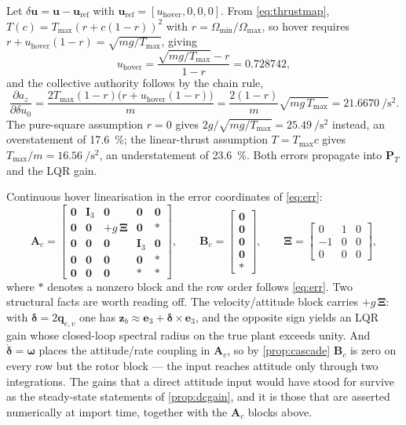 \documentclass[11pt,a4paper,twoside,openright]{report}
\newcommand{\vUhover}{0.728742}          %
\newcommand{\vDadc}{21.6670}             %
\renewcommand{\vec}[1]{\bm{#1}}
\newcommand{\mat}[1]{\bm{#1}}
\newcommand{\inp}{\vec{u}}
\newcommand{\bodyrate}{\vec{\omega}}
\newcommand{\refsym}{\mathrm{ref}}
\theoremstyle{plain}
\theoremstyle{definition}
\theoremstyle{remark}
\begin{document}
	Let $\delta\inp=\inp-\inp_\refsym$ with
	$\inp_\refsym=[u_\mathrm{hover},0,0,0]$. From \cref{eq:thrustmap},
	$T(c)=T_{\max}(r+c(1-r))^2$ with $r=\Omega_{\min}/\Omega_{\max}$, so hover
	requires $r+u_\mathrm{hover}(1-r)=\sqrt{mg/T_{\max}}$, giving
	\begin{equation}
		u_\mathrm{hover}=\frac{\sqrt{mg/T_{\max}}-r}{1-r}=\vUhover,
	\end{equation}
	and the collective authority follows by the chain rule,
	\begin{equation}
		\frac{\partial a_z}{\partial\delta u_0}
		=\frac{2T_{\max}(1-r)\big(r+u_\mathrm{hover}(1-r)\big)}{m}
		=\frac{2(1-r)}{m}\sqrt{mg\,T_{\max}}
		=\vDadc\ \si{\per\square\second}.
	\end{equation}
	The pure-square assumption $r=0$ gives $2g/\sqrt{mg/T_{\max}}=\SI{25.49}{\per\square\second}$
	instead, an overstatement of \SI{17.6}{\percent}; the linear-thrust assumption
	$T=T_{\max}c$ gives $T_{\max}/m=\SI{16.56}{\per\square\second}$, an
	understatement of \SI{23.6}{\percent}. Both errors propagate into $\mat P_T$ and
	the LQR gain.

	Continuous hover linearisation in the error coordinates of \cref{eq:err}:
	\begin{equation}
		\mat A_c=\begin{bmatrix}
			\mat 0 & \mat I_3 & \mat 0 & \mat 0 & \mat 0\\
			\mat 0 & \mat 0 & +g\,\mat\Xi & \mat 0 & \ast\\
			\mat 0 & \mat 0 & \mat 0 & \mat I_3 & \mat 0\\
			\mat 0 & \mat 0 & \mat 0 & \mat 0 & \ast\\
			\mat 0 & \mat 0 & \mat 0 & \ast & \ast
		\end{bmatrix},
		\qquad
		\mat B_c=\begin{bmatrix}\mat 0\\ \mat 0\\ \mat 0\\ \mat 0\\ \ast\end{bmatrix},
		\qquad
		\mat\Xi=\begin{bmatrix}0&1&0\\-1&0&0\\0&0&0\end{bmatrix},
	\end{equation}
	where $\ast$ denotes a nonzero block and the row order follows \cref{eq:err}.
	Two structural facts are worth reading off. The velocity/attitude block carries
	$+g\,\mat\Xi$: with $\vec\delta=2\vec q_{e,v}$ one has
	$\vec z_b\approx\vec e_3+\vec\delta\times\vec e_3$, and the opposite sign yields
	an LQR gain whose closed-loop spectral radius on the true plant exceeds unity.
	And $\dot{\vec\delta}=\bodyrate$ places the attitude/rate coupling in
	$\mat A_c$, so by \cref{prop:cascade} $\mat B_c$ is zero on every row but the
	rotor block --- the input reaches attitude only through two integrations. The
	gains that a direct attitude input would have stood for survive as the
	steady-state statements of \cref{prop:dcgain}, and it is those that are asserted
	numerically at import time, together with the $\mat A_c$ blocks above.
\end{document}
